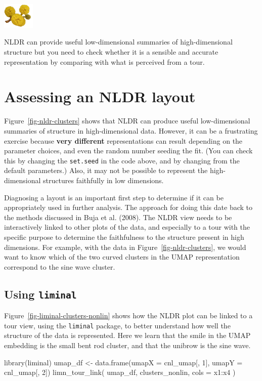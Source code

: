 \documentclass[
  letterpaper,
]{krantz}
\newenvironment{Shaded}{\begin{snugshade}}{\end{snugshade}}
\newcommand{\AttributeTok}[1]{\textcolor[rgb]{0.40,0.45,0.13}{#1}}
\newcommand{\DecValTok}[1]{\textcolor[rgb]{0.68,0.00,0.00}{#1}}
\newcommand{\FunctionTok}[1]{\textcolor[rgb]{0.28,0.35,0.67}{#1}}
\newcommand{\NormalTok}[1]{\textcolor[rgb]{0.00,0.23,0.31}{#1}}
\newcommand{\OtherTok}[1]{\textcolor[rgb]{0.00,0.23,0.31}{#1}}
\newcommand{\SpecialCharTok}[1]{\textcolor[rgb]{0.37,0.37,0.37}{#1}}
\newcommand{\infobox}[1]{%
\noindent\colorbox{info!30}{%
\begin{minipage}{0.98\linewidth}%
    \centering%
    \begin{minipage}[c]{0.15\linewidth} %
      \includegraphics[width=1.5cm]{images/mulga-flowers2.png} %
    \end{minipage}%
    \hfill %
    \begin{minipage}[c]{0.8\linewidth} %
      \bigskip%
      \textsf{#1}%
      \bigskip%
    \end{minipage}%
    \hspace*{3mm}%
  \end{minipage}%
}%
}
\begin{document}
\infobox{NLDR can provide useful low-dimensional summaries of high-dimensional structure but you need to check whether it is a sensible and accurate representation by comparing with what is perceived from a tour.}

\section{Assessing an NLDR layout}\label{assessing-an-nldr-layout}

Figure~\ref{fig-nldr-clusters} shows that NLDR can produce useful
low-dimensional summaries of structure in high-dimensional data.
However, it can be a frustrating exercise because \textbf{very
different} representations can result depending on the parameter
choices, and even the random number seeding the fit. (You can check this
by changing the \texttt{set.seed} in the code above, and by changing
from the default parameters.) Also, it may not be possible to represent
the high-dimensional structures faithfully in low dimensions.

Diagnosing a layout is an important first step to determine if it can be
appropriately used in further analysis. The approach for doing this date
back to the methods discussed in Buja et al. (2008). The NLDR view needs
to be interactively linked to other plots of the data, and especially to
a tour with the specific purpose to determine the faithfulness to the
structure present in high dimensions. For example, with the data in
Figure~\ref{fig-nldr-clusters}, we would want to know which of the two
curved clusters in the UMAP representation correspond to the sine wave
cluster.

\subsection{\texorpdfstring{Using
\texttt{liminal}}{Using liminal}}\label{using-liminal}


Figure~\ref{fig-liminal-clusters-nonlin} shows how the NLDR plot can be
linked to a tour view, using the \texttt{liminal} package, to better
understand how well the structure of the data is represented. Here we
learn that the smile in the UMAP embedding is the small bent rod
cluster, and that the unibrow is the sine wave.

\begin{Shaded}
\begin{Highlighting}[]
\FunctionTok{library}\NormalTok{(liminal)}
\NormalTok{umap\_df }\OtherTok{\textless{}{-}} \FunctionTok{data.frame}\NormalTok{(}\AttributeTok{umapX =}\NormalTok{ cnl\_umap[, }\DecValTok{1}\NormalTok{],}
                      \AttributeTok{umapY =}\NormalTok{ cnl\_umap[, }\DecValTok{2}\NormalTok{])}
\FunctionTok{limn\_tour\_link}\NormalTok{(}
\NormalTok{  umap\_df,}
\NormalTok{  clusters\_nonlin,}
  \AttributeTok{cols =}\NormalTok{ x1}\SpecialCharTok{:}\NormalTok{x4}
\NormalTok{)}
\end{Highlighting}
\end{Shaded}
\end{document}
